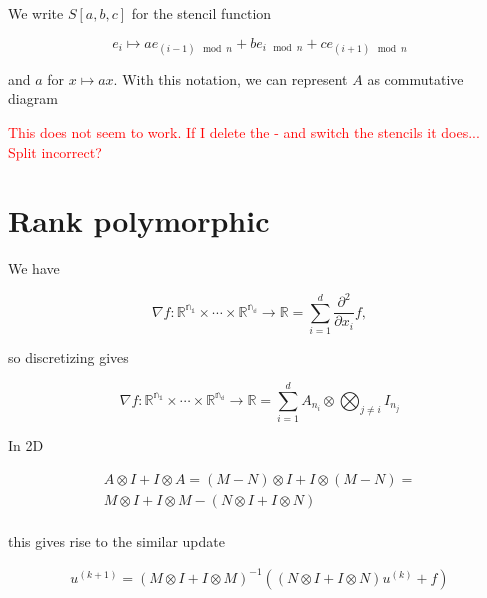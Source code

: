 \documentclass{article}
\begin{document}
We write $S[a, b, c]$ for the stencil function 

\[
    e_i \mapsto ae_{(i - 1) \mod n} + be_{i \mod n} + c e_{(i + 1) \mod n}
\]

and $a$ for $x \mapsto ax$. With this notation, we can represent $A$ as 
commutative diagram


\textcolor{red}{This does not seem to work. If I delete the - and switch the 
stencils it does... Split incorrect?}

\section{Rank polymorphic}

We have

\[
\nabla f: \mathbb{R^{n_1}} \times \cdots \times \mathbb{R^{n_d}} \to \mathbb{R} 
= \sum_{i = 1}^{d} \frac{\partial^2}{\partial x_i} f,
\]

so discretizing gives

\[
\nabla f: \mathbb{R^{n_1}} \times \cdots \times \mathbb{R^{n_d}} \to \mathbb{R} 
= \sum_{i = 1}^d A_{n_i} \otimes \bigotimes_{j \neq i} I_{n_j}
\]

In 2D

\begin{align*}
    A \otimes I + I \otimes A = (M - N) \otimes I + I \otimes (M - N) = \\
    M \otimes I + I \otimes M - (N \otimes I + I \otimes N) \\
\end{align*}

this gives rise to the similar update

\begin{align*}
    u^{(k + 1)} = (M \otimes I + I \otimes M)^{-1} 
            \left((N \otimes I + I \otimes N)u^{(k)} + f \right)
\end{align*}
\end{document}
